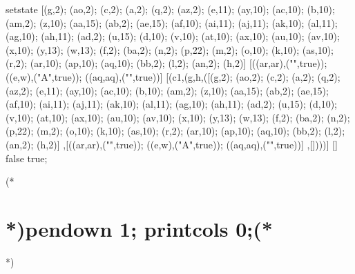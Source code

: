 setstate [(g,2); (ao,2); (c,2); (a,2); (q,2); (az,2); (e,11); (ay,10); (ac,10); (b,10); (am,2); (z,10); (aa,15); (ab,2); (ae,15); (af,10); (ai,11); (aj,11); (ak,10); (al,11); (ag,10); (ah,11); (ad,2); (u,15); (d,10); (v,10); (at,10); (ax,10); (au,10); (av,10); (x,10); (y,13); (w,13); (f,2); (ba,2); (n,2); (p,22); (m,2); (o,10); (k,10); (as,10); (r,2); (ar,10); (ap,10); (aq,10); (bb,2); (l,2); (an,2); (h,2)] [((ar,ar),("",true)); ((e,w),("\state A",true)); ((aq,aq),("",true))] [(c1,(g,h,([(g,2); (ao,2); (c,2); (a,2); (q,2); (az,2); (e,11); (ay,10); (ac,10); (b,10); (am,2); (z,10); (aa,15); (ab,2); (ae,15); (af,10); (ai,11); (aj,11); (ak,10); (al,11); (ag,10); (ah,11); (ad,2); (u,15); (d,10); (v,10); (at,10); (ax,10); (au,10); (av,10); (x,10); (y,13); (w,13); (f,2); (ba,2); (n,2); (p,22); (m,2); (o,10); (k,10); (as,10); (r,2); (ar,10); (ap,10); (aq,10); (bb,2); (l,2); (an,2); (h,2)] ,[((ar,ar),("",true)); ((e,w),("\state A",true)); ((aq,aq),("",true))] ,[])))] [] false true;

(*\section{*)pendown 1; printcols 0;(*}*)

